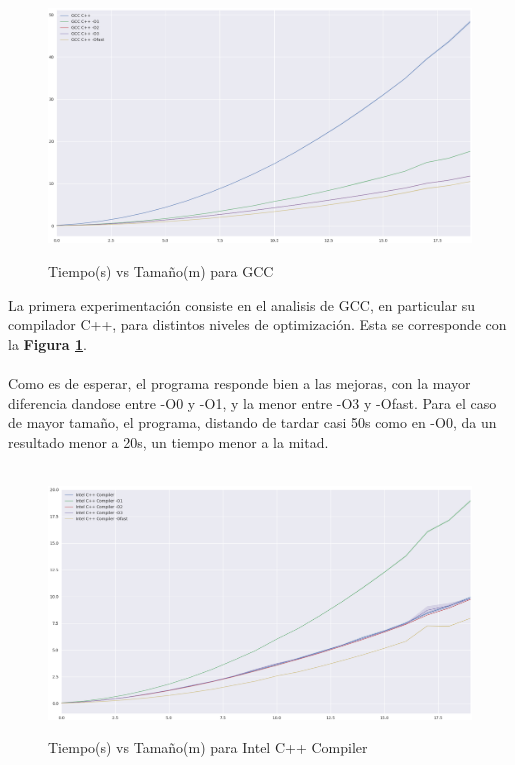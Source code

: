 \begin{figure}[!htbp]
\caption{Tiempo(s) vs Tamaño(m) para GCC}
\includegraphics[width=\textwidth]{imagenes/plot_cpp.png}
\label{fig:plot_cpp}
\end{figure}

La primera experimentación consiste en el analisis de GCC, en particular su compilador C++, para distintos niveles de optimización. Esta se corresponde con la \textbf{Figura \ref{fig:plot_cpp}}.
~\\
~\\
Como es de esperar, el programa responde bien a las mejoras, con la mayor diferencia dandose entre -O0 y -O1, y la menor entre -O3 y -Ofast. Para el caso de mayor tamaño, el programa, distando de tardar casi 50s como en -O0, da un resultado menor a 20s, un tiempo menor a la mitad.
~\\
~\\
\begin{figure}[!htbp]
\caption{Tiempo(s) vs Tamaño(m) para Intel C++ Compiler}
\includegraphics[width=\textwidth]{imagenes/plot_icc.png}
\label{fig:plot_icc}
\end{figure}


